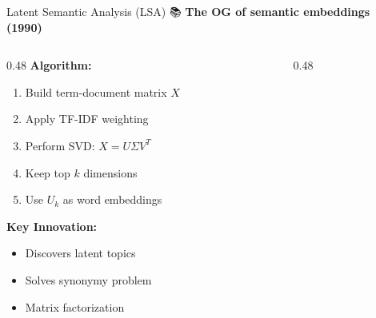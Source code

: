 \documentclass[aspectratio=169]{beamer}
\begin{document}
\begin{frame}[shrink=10]{Latent Semantic Analysis (LSA) 📚}
\textbf{The OG of semantic embeddings (1990)}

\vspace{1em}

\begin{columns}[T]
\begin{column}{0.48\textwidth}
\textbf{Algorithm:}
\begin{enumerate}\setlength{\itemsep}{0pt}
    \item Build term-document matrix $X$
    \item Apply TF-IDF weighting
    \item Perform SVD: $X = U\Sigma V^T$
    \item Keep top $k$ dimensions
    \item Use $U_k$ as word embeddings
\end{enumerate}

\vspace{0.5em}
\textbf{Key Innovation:}
\begin{itemize}\setlength{\itemsep}{0pt}
    \item Discovers latent topics
    \item Solves synonymy problem
    \item Matrix factorization
\end{itemize}
\end{column}

\begin{column}{0.48\textwidth}
\begin{center}
\end{center}


\end{column}
\end{columns}
\end{frame}
\end{document}
